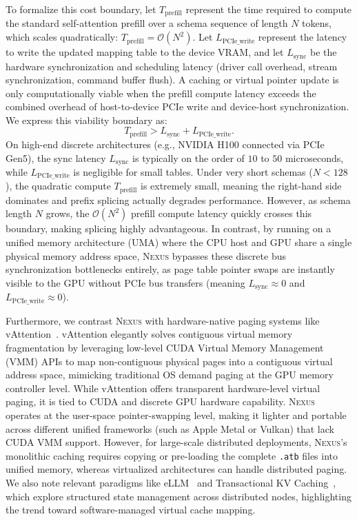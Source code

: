 \documentclass[conference,10pt]{IEEEtran}
\newcommand{\Nexus}{\textsc{Nexus}\xspace}
\newcommand{\atb}{\texttt{.atb}\xspace}
\begin{document}
To formalize this cost boundary, let $T_{\text{prefill}}$ represent the time required to compute the standard self-attention prefill over a schema sequence of length $N$ tokens, which scales quadratically: $T_{\text{prefill}} = \mathcal{O}(N^2)$. Let $L_{\text{PCIe\_write}}$ represent the latency to write the updated mapping table to the device VRAM, and let $L_{\text{sync}}$ be the hardware synchronization and scheduling latency (driver call overhead, stream synchronization, command buffer flush). A caching or virtual pointer update is only computationally viable when the prefill compute latency exceeds the combined overhead of host-to-device PCIe write and device-host synchronization. We express this viability boundary as:
\begin{equation}
T_{\text{prefill}} > L_{\text{sync}} + L_{\text{PCIe\_write}}.
\end{equation}
On high-end discrete architectures (e.g., NVIDIA H100 connected via PCIe Gen5), the sync latency $L_{\text{sync}}$ is typically on the order of $10$ to $50$ microseconds, while $L_{\text{PCIe\_write}}$ is negligible for small tables. Under very short schemas ($N < 128$), the quadratic compute $T_{\text{prefill}}$ is extremely small, meaning the right-hand side dominates and prefix splicing actually degrades performance. However, as schema length $N$ grows, the $\mathcal{O}(N^2)$ prefill compute latency quickly crosses this boundary, making splicing highly advantageous. In contrast, by running on a unified memory architecture (UMA) where the CPU host and GPU share a single physical memory address space, \Nexus bypasses these discrete bus synchronization bottlenecks entirely, as page table pointer swaps are instantly visible to the GPU without PCIe bus transfers (meaning $L_{\text{sync}} \approx 0$ and $L_{\text{PCIe\_write}} \approx 0$).

Furthermore, we contrast \Nexus with hardware-native paging systems like vAttention~\cite{vattention2025}. vAttention elegantly solves contiguous virtual memory fragmentation by leveraging low-level CUDA Virtual Memory Management (VMM) APIs to map non-contiguous physical pages into a contiguous virtual address space, mimicking traditional OS demand paging at the GPU memory controller level. While vAttention offers transparent hardware-level virtual paging, it is tied to CUDA and discrete GPU hardware capability. \Nexus operates at the user-space pointer-swapping level, making it lighter and portable across different unified frameworks (such as Apple Metal or Vulkan) that lack CUDA VMM support. However, for large-scale distributed deployments, \Nexus's monolithic caching requires copying or pre-loading the complete \atb files into unified memory, whereas virtualized architectures can handle distributed paging. We also note relevant paradigms like eLLM~\cite{ellm} and Transactional KV Caching~\cite{transkvcache}, which explore structured state management across distributed nodes, highlighting the trend toward software-managed virtual cache mapping.
\end{document}
